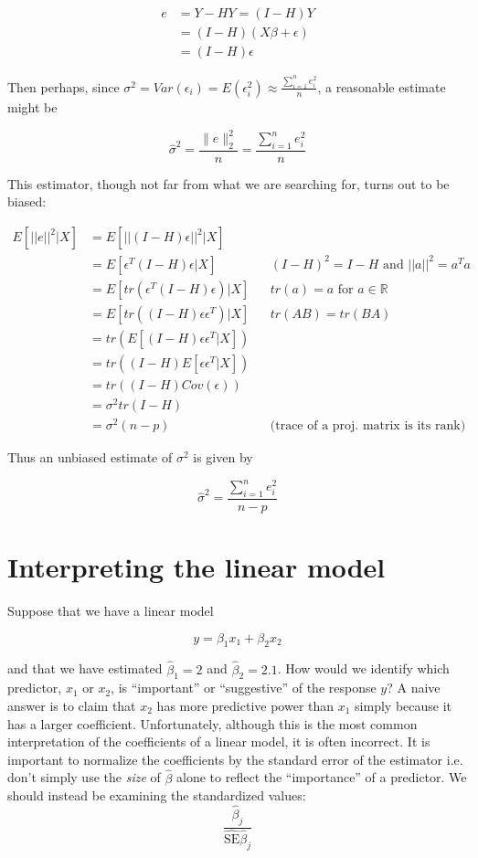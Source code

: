 \begin{align*}
e &= Y - HY = (I - H)Y\\
& = (I- H)(X\beta + \epsilon)\\
& = (I - H) \epsilon
\end{align*}

Then perhaps, since $\sigma^2 = Var(\epsilon_i) = E(\epsilon_i^2) \approx \frac{\sum_{i=1}^n e_i^2}{n}$, a reasonable estimate might be

$$\hat{\sigma}^2 = \frac{\|e\|_2^2}{n} = \frac{\sum_{i=1}^n e_i^2}{n}$$


This estimator, though not far from what we are searching for, turns out to be biased:

\begin{align*}
E\left[ ||e||^2 \Big| X \right] & = E \left[ ||(I - H) \epsilon||^2 \Big | X\right]\\
& = E\left[ \epsilon^T (I - H) \epsilon \Big| X\right] && (I - H)^2 = I - H \text{ and } ||a||^2 = a^Ta\\
& = E \left[ tr(\epsilon^T(I - H) \epsilon )\Big| X \right] && tr(a) = a \text{ for }a \in \mathbb{R} \\
& = E\left[ tr((I - H) \epsilon \epsilon^T) \Big| X \right] && tr(AB) = tr(BA)\\
& = tr\left( E\left[(I - H) \epsilon \epsilon^T \Big| X \right]\right)\\
& = tr\left((I - H) E\left[\epsilon \epsilon^T \Big| X \right]\right)\\
& = tr\left((I - H) Cov( \epsilon) \right)\\
& = \sigma^2 tr(I - H)\\
& = \sigma^2 (n  -p) &&\text{(trace of a proj. matrix is its rank)}
\end{align*}

Thus an unbiased estimate of $\sigma^2$ is given by

$$\hat{\sigma}^2 = \frac{\sum_{i=1}^ne_i^2}{n-p}$$


%
\section{Interpreting the linear model}

Suppose that we have a linear model

$$y = \beta_1 x_1 + \beta_2 x_2$$

and that we have estimated $\hat{\beta}_1 = 2$ and $\hat{\beta}_2 = 2.1$. How would we identify which predictor, $x_1$ or $x_2$, is ``important'' or ``suggestive'' of the response $y$? A naive answer is to claim that $x_2$ has more predictive power than $x_1$ simply because it has a larger coefficient. Unfortunately, although this is the most common interpretation of the coefficients of a linear model, it is often incorrect. It is important to normalize the coefficients by the standard error of the estimator i.e. don't simply use the \textit{size} of $\hat{\beta}$ alone to reflect the ``importance'' of a predictor. We should instead be examining the standardized values:
$$\frac{\hat{\beta}_j}{\hat{\text{SE}}{\hat{\beta}_j}}$$

